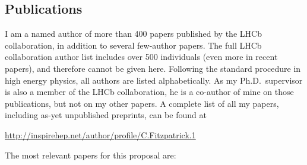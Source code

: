 \subsection*{Publications} 
I am a named author of more than 400 papers published by the LHCb collaboration, in addition to several few-author papers. The full LHCb collaboration author list includes over 500 individuals (even more in recent papers), and therefore cannot be given here.  
Following the standard procedure in high energy physics, all authors are listed alphabetically.
As my Ph.D.\ supervisor is also a member of the LHCb collaboration, he is a co-author of mine on those publications, but not on my other papers.
A complete list of all my papers, including as-yet unpublished preprints, can be found at 
\begin{center}
    \href{http://inspirehep.net/author/profile/C.Fitzpatrick.1}{http://inspirehep.net/author/profile/C.Fitzpatrick.1}
\end{center}
The most relevant papers for this proposal are:

